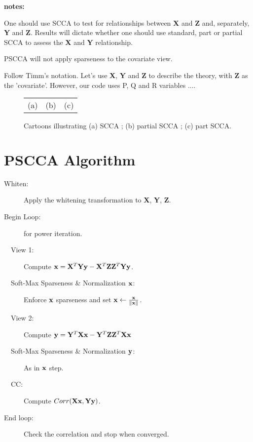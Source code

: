 \documentclass{llncs}
\newcommand{\X}{{\bf X}}
\newcommand{\x}{{\bf x}}
\newcommand{\Y}{{\bf Y}}
\newcommand{\y}{{\bf y}}
\newcommand{\Z}{{\bf Z}}
\begin{document}
{\bf notes:}

One should use SCCA to test for relationships between {\X} and {\Z} and, separately, {\Y} and {\Z}.  Results will dictate whether
one should use standard, part or partial SCCA to assess the {\X} and {\Y}
relationship.

PSCCA will not apply sparseness to the covariate view.  

Follow Timm's notation.  Let's use {\X}, {\Y} and {\Z} to describe the theory, with {\Z} as the
'covariate'.   However, our code uses P, Q and R variables ....
 

\begin{figure}
\begin{center}
\begin{tabular}{ccc}
(a) & (b) & (c) \\
\end{tabular}
\end{center}
\caption{\baselineskip 12pt \small Cartoons illustrating (a) SCCA ;
  (b) partial SCCA ; (c) part SCCA.  }
\label{fig:cartoon}
\end{figure}

\section{PSCCA Algorithm}
\vspace{0.1in}
\vspace{-0.1in}
\begin{description}
\item [Whiten:]Apply the whitening transformation to {\X}, {\Y}, {\Z}.
\item [Begin Loop:]for power iteration. 
\item [~~View 1:]Compute  $\x= {\X}^T {\Y} \y -  {\X}^T  {\Z} {\Z}^T {\Y} \y$.
\item [~~Soft-Max Sparseness \& Normalization $\x$:] Enforce $\x$
  sparseness and set $\x \leftarrow \frac{\x}{\|\x\|}$.
\item [~~View 2:]Compute  $\y= {\Y}^T {\X} \x -  {\Y}^T  {\Z} {\Z}^T
  {\X} \x$
\item [~~Soft-Max Sparseness \& Normalization $\y$:] As in $\x$ step.
\item [~~CC:]Compute $Corr( {\X} \x ,  {\Y} \y )$.
\item [End loop:]Check the correlation and stop when converged.
\end{description}
 
\end{document}
